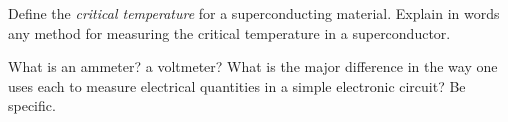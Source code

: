 \documentclass[addpoints]{physlabs}
\date{\today}
\begin{document}
\maketitle

\begin{prelab}

    \filbreak
    \question[1] Define the \textsl{critical temperature} for a superconducting material. Explain in words any method for measuring the critical temperature in a superconductor.
    \begin{solution}[6cm]
        
    \end{solution}

    \filbreak
    \question[1] What is an ammeter? a voltmeter? What is the major difference in the way one uses each to measure electrical quantities in a simple electronic circuit? Be specific.
    \begin{solution}[6cm]
        
    \end{solution}
        
\end{prelab}
\end{document}
